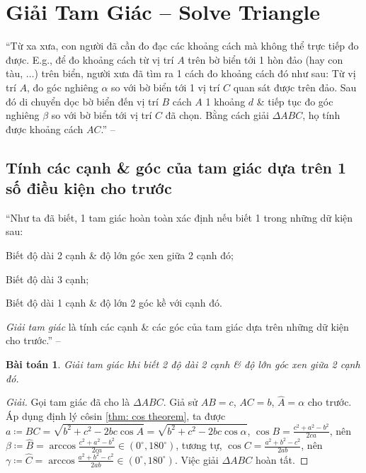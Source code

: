 \documentclass[oneside]{book}
\numberwithin{equation}{section}
\newtheorem{baitoan}{Bài toán}[section]
\begin{document}
\section{Giải Tam Giác -- Solve Triangle}
``Từ xa xưa, con người đã cần đo đạc các khoảng cách mà không thể trực tiếp đo được. E.g., để đo khoảng cách từ vị trí $A$ trên bờ biển tới 1 hòn đảo (hay con tàu, $\ldots$) trên biển, người xưa đã tìm ra 1 cách đo khoảng cách đó như sau: Từ vị trí $A$, đo góc nghiêng $\alpha$ so với bờ biển tới 1 vị trí $C$ quan sát được trên đảo. Sau đó di chuyển dọc bờ biển đến vị trí $B$ cách $A$ 1 khoảng $d$ \& tiếp tục đo góc nghiêng $\beta$ so với bờ biển tới vị trí $C$ đã chọn. Bằng cách giải $\Delta ABC$, họ tính được khoảng cách $AC$.'' -- \cite[p. 72]{SGK_Toan_10_Canh_Dieu_tap_1}

\subsection{Tính các cạnh \& góc của tam giác dựa trên 1 số điều kiện cho trước}
``Như ta đã biết, 1 tam giác hoàn toàn xác định nếu biết 1 trong những dữ kiện sau:
\begin{enumerate*}
	\item Biết độ dài 2 cạnh \& độ lớn góc xen giữa 2 cạnh đó;
	\item Biết độ dài 3 cạnh;
	\item Biết độ dài 1 cạnh \& độ lớn 2 góc kề với cạnh đó.
\end{enumerate*}
\textit{Giải tam giác} là tính các cạnh \& các góc của tam giác dựa trên những dữ kiện cho trước.'' -- \cite[p. 72]{SGK_Toan_10_Canh_Dieu_tap_1}

\begin{baitoan}
	Giải tam giác khi biết 2 độ dài 2 cạnh \& độ lớn góc xen giữa 2 cạnh đó.
\end{baitoan}

\begin{proof}[Giải]
	Gọi tam giác đã cho là $\Delta ABC$. Giả sử $AB = c$, $AC = b$, $\widehat{A} = \alpha$ cho trước. Áp dụng định lý côsin \ref{thm: cos theorem}, ta được $a\coloneqq BC = \sqrt{b^2 + c^2 - 2bc\cos A} = \sqrt{b^2 + c^2 - 2bc\cos\alpha}$, $\cos B = \frac{c^2 + a^2 - b^2}{2ca}$, nên $\beta\coloneqq\widehat{B} = \arccos\frac{c^2 + a^2 - b^2}{2ca}\in(0^\circ,180^\circ)$, tương tự, $\cos C = \frac{a^2 + b^2 - c^2}{2ab}$, nên $\gamma\coloneqq\widehat{C} = \arccos\frac{a^2 + b^2 - c^2}{2ab}\in(0^\circ,180^\circ)$. Việc giải $\Delta ABC$ hoàn tất.
\end{proof}
\end{document}
